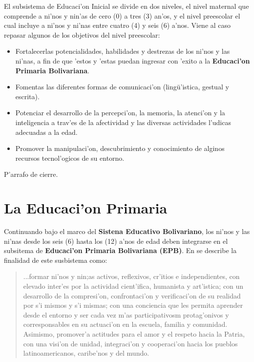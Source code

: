 El subsistema de Educaci'on Inicial se divide en dos niveles, el nivel maternal que comprende a ni'nos y nin'as de cero (0) a tres (3) an'os, y el nivel preescolar el cual incluye a ni'nos y ni'nas entre cuatro (4) y seis (6) a'nos. Viene al caso repasar algunos de los objetivos del nivel preescolar:

\begin{itemize}
	\item Fortalecerlas potencialidades, habilidades y destrezas de los ni'nos y las ni'nas, a fin de que 'estos y 'estas puedan ingresar con 'exito a la \textbf{Educaci'on Primaria Bolivariana}.
	\item Fomentas las diferentes formas de comunicaci'on (ling\"{u}'istica, gestual y escrita).
	\item Potenciar el desarrollo de la percepci'on, la memoria, la atenci'on y la inteligencia a trav'es de la afectividad y las diversas actividades l'udicas adecuadas a la edad.
	\item Promover la manipulaci'on, descubrimiento y conocimiento de alginos recursos tecnol'ogicos de su entorno.
\end{itemize}

{\color{red} P'arrafo de cierre.}

\section{La Educaci'on Primaria}
Continuando bajo el marco del \textbf{Sistena Educativo Bolivariano}, los ni'nos y las ni'nas desde los seis (6) hasta los (12) a'nos de edad deben integrarse en el subsitema de \textbf{Educaci'on Primaria Bolivariana (EPB)}. En \cite{CurriculoSEPB} se describe la finalidad de este susbistema como:

\begin{quote}
	...formar ni'nos y nin;as activos, reflexivos, cr'itios e independientes, con elevado inter'es por la actividad cient'ifica, humanista y art'istica; con un desarrollo de la compresi'on, confrontaci'on y verificaci'on de su realidad por s'i mismos y s'i mismas; con una conciencia que les permita aprender desde el entorno y ser cada vez m'as participativosm protag'onivos y corresponsables en su actuaci'on en la escuela, familia y comunidad. Asimismo, promover'a actitudes para el amor y el respeto hacia la Patria, con una visi'on de unidad, integraci'on y cooperaci'on hacia los pueblos latinoamericanos, caribe'nos y del mundo.
\end{quote}

